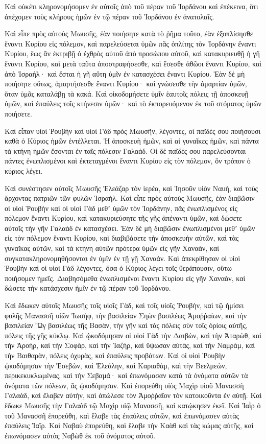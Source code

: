 {Καὶ οὐκέτι κληρονομήσομεν ἐν αὐτοῖς ἀπὸ τοῦ πέραν τοῦ Ἰορδάνου καὶ ἐπέκεινα, ὅτι ἀπέχομεν τοὺς κλήρους ἡμῶν ἐν τῷ πέραν τοῦ Ἰορδάνου ἐν ἀνατολαῖς.
\par }{\PP {}Καὶ εἶπε πρὸς αὐτοὺς Μωυσῆς, ἐὰν ποιήσητε κατὰ τὸ ῥῆμα τοῦτο, ἐὰν ἐξοπλίσησθε ἔναντι Κυρίου εἰς πόλεμον,
καὶ παρελεύσεται ὑμῶν πᾶς ὁπλίτης τὸν Ἰορδάνην ἔναντι Κυρίου, ἕως ἂν ἐκτριβῇ ὁ ἐχθρὸς αὐτοῦ ἀπὸ προσώπου αὐτοῦ,
καὶ κατακυριευθῇ ἡ γῆ ἔναντι Κυρίου, καὶ μετὰ ταῦτα ἀποστραφήσεσθε, καὶ ἔσεσθε ἀθῶοι ἔναντι Κυρίου, καὶ ἀπὸ Ἰσραήλ· καὶ ἔσται ἡ γῆ αὕτη ὑμῖν ἐν κατασχέσει ἔναντι Κυρίου.
Ἐὰν δὲ μὴ ποιήσητε οὕτως, ἁμαρτήσεσθε ἔναντι Κυρίου· καὶ γνώσεσθε τὴν ἁμαρτίαν ὑμῶν, ὅταν ὑμᾶς καταλάβῃ τὰ κακά.
Καὶ οἰκοδομήσετε ὑμῖν ἑαυτοῖς πόλεις τῇ ἀποσκευῇ ὑμῶν, καὶ ἐπαύλεις τοῖς κτήνεσιν ὑμῶν· καὶ τὸ ἐκπορευόμενον ἐκ τοῦ στόματος ὑμῶν ποιήσετε.
\par }{\PP {}Καὶ εἶπαν υἱοὶ Ῥουβὴν καὶ υἱοὶ Γὰδ πρὸς Μωυσῆν, λέγοντες, οἱ παῖδές σου ποιήσουσι καθὰ ὁ Κύριος ἡμῶν ἐντέλλεται.
Ἡ ἀποσκευὴ ἡμῶν, καὶ αἱ γυναῖκες ἡμῶν, καὶ πάντα τὰ κτήνη ἡμῶν ἔσονται ἐν ταῖς πόλεσιν Γαλαάδ.
Οἱ δὲ παῖδές σου παρελεύσονται πάντες ἐνωπλισμένοι καὶ ἐκτεταγμένοι ἔναντι Κυρίου εἰς τὸν πόλεμον, ὃν τρόπον ὁ κύριος λέγει.
\par }{\PP {}Καὶ συνέστησεν αὐτοῖς Μωυσῆς Ἐλεάζαρ τὸν ἱερέα, καὶ Ἰησοῦν υἱὸν Ναυὴ, καὶ τοὺς ἄρχοντας πατριῶν τῶν φυλῶν Ἰσραήλ.
Καὶ εἶπε πρὸς αὐτοὺς Μωυσῆς, ἐὰν διαβῶσιν οἱ υἱοὶ Ῥουβὴν καὶ οἱ υἱοὶ Γὰδ μεθʼ ὑμῶν τὸν Ἰορδάνην, πᾶς ἐνωπλισμένος εἰς πόλεμον ἔναντι Κυρίου, καὶ κατακυριεύσητε τῆς γῆς ἀπέναντι ὑμῶν, καὶ δώσετε αὐτοῖς τὴν γῆν Γαλαὰδ ἐν κατασχέσει.
Ἐὰν δὲ μὴ διαβῶσιν ἐνωπλισμένοι μεθʼ ὑμῶν εἰς τὸν πόλεμον ἔναντι Κυρίου, καὶ διαβιβάσετε τὴν ἀποσκευὴν αὐτῶν, καὶ τὰς γυναῖκας αὐτῶν, καὶ τὰ κτήνη αὐτῶν πρότερα ὑμῶν εἰς γῆν Χαναὰν, καὶ συγκατακληρονομηθήσονται ἐν ὑμῖν ἐν τῇ γῇ Χαναάν.
Καὶ ἀπεκρίθησαν οἱ υἱοὶ Ῥουβὴν καὶ οἱ υἱοὶ Γὰδ λέγοντες, ὅσα ὁ Κύριος λέγει τοῖς θεράπουσιν, οὕτω ποιήσομεν ἡμεῖς.
Διαβησόμεθα ἐνωπλισμένοι ἔναντι Κυρίου εἰς γῆν Χαναὰν, καὶ δώσετε τὴν κατάσχεσιν ἡμῖν ἐν τῷ πέραν τοῦ Ἰορδάνου.
\par }{\PP {}Καὶ ἔδωκεν αὐτοῖς Μωυσῆς τοῖς υἱοῖς Γὰδ, καὶ τοῖς υἱοῖς Ῥουβὴν, καὶ τῷ ἡμίσει φυλῆς Μανασσῆ υἱῶν Ἰωσὴφ, τὴν βασιλείαν Σηὼν βασιλέως Ἀμοῤῥαίων, καὶ τὴν βασιλείαν Ὢγ βασιλέως τῆς Βασὰν, τὴν γῆν καὶ τὰς πόλεις σὺν τοῖς ὁρίοις αὐτῆς, πόλεις τῆς γῆς κύκλῳ.
Καὶ ᾠκοδόμησαν οἱ υἱοὶ Γὰδ τὴν Δαιβὼν, καὶ τὴν Ἀταρὼθ, καὶ τὴν Ἀροὴρ,
καὶ τὴν Σοφὰρ, καὶ τὴν Ἰαζὴρ, καὶ ὕψωσαν αὐτὰς,
καὶ τὴν Ναμρὰμ, καὶ τὴν Βαιθαρὰν, πόλεις ὀχυρὰς, καὶ ἐπαύλεις προβάτων.
Καὶ οἱ υἱοὶ Ῥουβὴν ᾠκοδόμησαν τὴν Ἐσεβὼν, καὶ Ἐλεάλην, καὶ Καριαθὰμ,
καὶ τὴν Βεελμεὼν, περικεκυκλωμένας, καὶ τὴν Σεβαμά· καὶ ἐπωνόμασαν κατὰ τὰ ὀνόματα αὐτῶν τὰ ὀνόματα τῶν πόλεων, ἃς ᾠκοδόμησαν.
Καὶ ἐπορεύθη υἱὸς Μαχὶρ υἱοῦ Μανασσὴ Γαλαὰδ, καὶ ἔλαβεν αὐτὴν, καὶ ἀπώλεσε τὸν Ἀμοῤῥαῖον τὸν κατοικοῦντα ἐν αὐτῇ.
Καὶ ἔδωκε Μωυσῆς τὴν Γαλαὰδ τῷ Μαχὶρ υἱῷ Μανασσῆ, καὶ κατῴκησεν ἐκεῖ.
Καὶ Ἰαῒρ ὁ τοῦ Μανασσῆ ἐπορεύθη, καὶ ἔλαβε τὰς ἐπαύλεις αὐτῶν, καὶ ἐπωνόμασεν αὐτὰς ἐπαύλεις Ἰαΐρ.
Καὶ Ναβαὺ ἐπορεύθη, καὶ ἔλαβε τὴν Καὰθ καὶ τὰς κώμας αὐτῆς, καὶ ἐπωνόμασεν αὐτὰς Ναβὼθ ἐκ τοῦ ὀνόματος αὐτοῦ.

}
